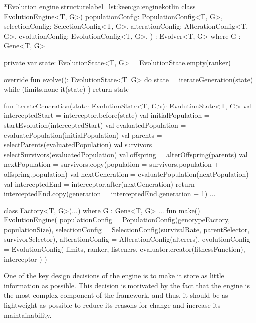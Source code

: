   \begin{code}*{Evolution engine structure}{label={lst:keen:ga:engine}}{kotlin}
    class EvolutionEngine<T, G>(
        populationConfig: PopulationConfig<T, G>,
        selectionConfig: SelectionConfig<T, G>,
        alterationConfig: AlterationConfig<T, G>,
        evolutionConfig: EvolutionConfig<T, G>,
    ) : Evolver<T, G> where G : Gene<T, G> {
    
        private var state: EvolutionState<T, G> = EvolutionState.empty(ranker)
    
        override fun evolve(): EvolutionState<T, G> {
            do {
                state = iterateGeneration(state)
            } while (limits.none { it(state) })
            return state
        }
    
        fun iterateGeneration(state: EvolutionState<T, G>): EvolutionState<T, G> {
            val interceptedStart = interceptor.before(state)
            val initialPopulation = startEvolution(interceptedStart)
            val evaluatedPopulation = evaluatePopulation(initialPopulation)
            val parents = selectParents(evaluatedPopulation)
            val survivors = selectSurvivors(evaluatedPopulation)
            val offspring = alterOffspring(parents)
            val nextPopulation = survivors.copy(population = survivors.population + offspring.population)
            val nextGeneration = evaluatePopulation(nextPopulation)
            val interceptedEnd = interceptor.after(nextGeneration)
            return interceptedEnd.copy(generation = interceptedEnd.generation + 1)
        }
        ...

        class Factory<T, G>(...) where G : Gene<T, G> {
            ...
            fun make() = EvolutionEngine(
                populationConfig = PopulationConfig(genotypeFactory, populationSize),
                selectionConfig = SelectionConfig(survivalRate, parentSelector, survivorSelector),
                alterationConfig = AlterationConfig(alterers),
                evolutionConfig = EvolutionConfig(
                    limits, ranker, listeners, evaluator.creator(fitnessFunction), interceptor
                )
            )
        }
    }
  
  \end{code}

  One of the key design decisions of the engine is to make it store as little
  information as possible.
  This decision is motivated by the fact that the engine is the most complex
  component of the framework, and thus, it should be as lightweight as possible
  to reduce its reasons for change and increase its maintainability.

